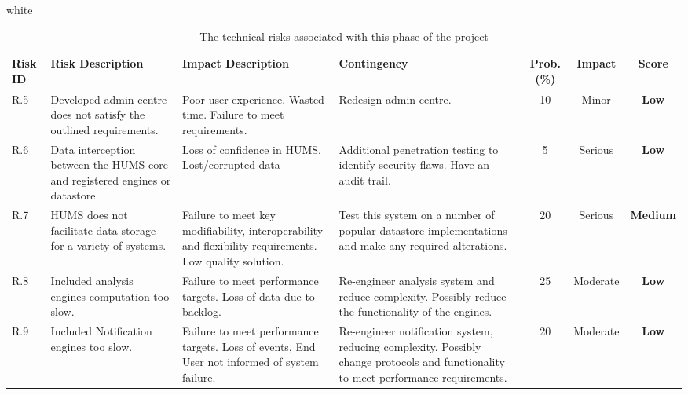 \documentclass[10pt,a4paper]{article}
\newcommand{\tableformat}[4]{
\begin{table}[H]
\centering
  \rowcolors{2}{gray!10} {white}
\begin{tabular}{#1}
  \hline
  \rowcolor[gray]{0.9} #2
\end{tabular}
\caption{#3}
\label{#4}
\end{table}}
\begin{document}
\tableformat{p{0.8cm} p{3cm} p{3cm} p{3cm} c c c}
{ 	\hline
    Risk ID & Risk Description & Impact Description & Contingency & Prob.(\%) & Impact & Score \\
  	\hline
  
    R.5 & Developed admin centre does not satisfy the outlined requirements. & Poor user experience. Wasted time. Failure to meet requirements. & Redesign admin centre. & 10 & Minor & \textbf{Low} \\
   	R.6 & Data interception between the HUMS core and registered engines or datastore. & Loss of confidence in HUMS. Lost/corrupted data & Additional penetration testing to identify security flaws. Have an audit trail. & 5 & Serious &  \textbf{Low} \\
   	R.7 & HUMS does not facilitate data storage for a variety of systems. & Failure to meet key modifiability, interoperability and flexibility requirements. Low quality solution. &  Test this system on a number of popular datastore implementations and make any required alterations. & 20 & Serious & \textbf{Medium} \\
   	R.8 & Included analysis engines computation too slow. & Failure to meet performance targets. Loss of data due to backlog. & Re-engineer analysis system and reduce complexity. Possibly reduce the functionality of the engines. & 25 & Moderate & \textbf{Low} \\	
    R.9 & Included Notification engines too slow. & Failure to meet performance targets. Loss of events, End User not informed of system failure. & Re-engineer notification system, reducing complexity. Possibly change protocols and functionality to meet performance requirements. & 20 & Moderate & \textbf{Low} \\	
  	\hline
}
{The technical risks associated with this phase of the project}{tab:tech_risks}
\end{document}
